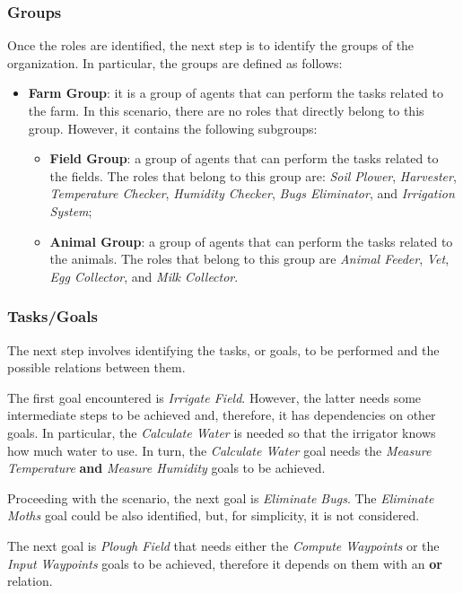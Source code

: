 \subsubsection{Groups}
Once the roles are identified, the next step is to identify the groups of the organization.
In particular, the groups are defined as follows:
\begin{itemize}
    \item \textbf{Farm Group}: it is a group of agents that can perform the tasks related to the farm.
    In this scenario, there are no roles that directly belong to this group.
    However, it contains the following subgroups:
    \begin{itemize}
        \item \textbf{Field Group}: a group of agents that can perform the tasks related to the fields.
        The roles that belong to this group are: \textit{Soil Plower}, \textit{Harvester}, \textit{Temperature Checker}, \textit{Humidity Checker}, \textit{Bugs Eliminator}, and \textit{Irrigation System};
        \item \textbf{Animal Group}: a group of agents that can perform the tasks related to the animals.
        The roles that belong to this group are \textit{Animal Feeder}, \textit{Vet}, \textit{Egg Collector}, and \textit{Milk Collector}.
    \end{itemize}
\end{itemize}

\subsubsection{Tasks/Goals}
The next step involves identifying the tasks, or goals, to be performed and the possible relations between them.

The first goal encountered is \textit{Irrigate Field}.
However, the latter needs some intermediate steps to be achieved and, therefore, it has dependencies on other goals.
In particular, the \textit{Calculate Water} is needed so that the irrigator knows how much water to use.
In turn, the \textit{Calculate Water} goal needs the \textit{Measure Temperature} \textbf{and} \textit{Measure Humidity} goals to be achieved.

Proceeding with the scenario, the next goal is \textit{Eliminate Bugs}.
The \textit{Eliminate Moths} goal could be also identified, but, for simplicity, it is not considered.

The next goal is \textit{Plough Field} that needs either the \textit{Compute Waypoints} or the \textit{Input Waypoints} goals to be achieved, therefore it depends on them with an \textbf{or} relation.

